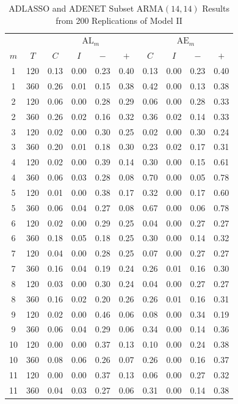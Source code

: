 \begin{table}[ht!]
\footnotesize
\centering
\caption{ADLASSO and ADENET Subset ARMA$(14,14)$ Results from 200 Replications of Model II}
\begin{tabular}{cc|cccc|cccc}
  \hline
    & & \multicolumn{4}{c|}{$\textrm{AL}_m$} & \multicolumn{4}{c}{$\textrm{AE}_m$} \\
  \cline{4-5}  \cline{8-9}  
  $m$ & $T$ & $C$ & $I$ & $-$ & $+$ & $C$ & $I$ & $-$ & $+$ \\
  \hline
  1 & 120 & 0.13 & 0.00 & 0.23 & 0.40 & 0.13 & 0.00 & 0.23 & 0.40 \\ 
  1 & 360 & 0.26 & 0.01 & 0.15 & 0.38 & 0.42 & 0.00 & 0.13 & 0.38 \\ 
  2 & 120 & 0.06 & 0.00 & 0.28 & 0.29 & 0.06 & 0.00 & 0.28 & 0.33 \\ 
  2 & 360 & 0.26 & 0.02 & 0.16 & 0.32 & 0.36 & 0.02 & 0.14 & 0.33 \\ 
  3 & 120 & 0.02 & 0.00 & 0.30 & 0.25 & 0.02 & 0.00 & 0.30 & 0.24 \\ 
  3 & 360 & 0.20 & 0.01 & 0.18 & 0.30 & 0.23 & 0.02 & 0.17 & 0.31 \\ 
  \hline
  4 & 120 & 0.02 & 0.00 & 0.39 & 0.14 & 0.30 & 0.00 & 0.15 & 0.61 \\ 
  4 & 360 & 0.06 & 0.03 & 0.28 & 0.08 & 0.70 & 0.00 & 0.05 & 0.78 \\ 
  5 & 120 & 0.01 & 0.00 & 0.38 & 0.17 & 0.32 & 0.00 & 0.17 & 0.60 \\ 
  5 & 360 & 0.06 & 0.04 & 0.27 & 0.08 & 0.67 & 0.00 & 0.06 & 0.78 \\
  \hline
  6 & 120 & 0.02 & 0.00 & 0.29 & 0.25 & 0.04 & 0.00 & 0.27 & 0.27 \\ 
  6 & 360 & 0.18 & 0.05 & 0.18 & 0.25 & 0.30 & 0.00 & 0.14 & 0.32 \\ 
  7 & 120 & 0.04 & 0.00 & 0.28 & 0.25 & 0.07 & 0.00 & 0.27 & 0.27 \\ 
  7 & 360 & 0.16 & 0.04 & 0.19 & 0.24 & 0.26 & 0.01 & 0.16 & 0.30 \\ 
  8 & 120 & 0.03 & 0.00 & 0.30 & 0.24 & 0.04 & 0.00 & 0.27 & 0.27 \\ 
  8 & 360 & 0.16 & 0.02 & 0.20 & 0.26 & 0.26 & 0.01 & 0.16 & 0.31 \\ 
  \hline
  9 & 120 & 0.02 & 0.00 & 0.46 & 0.06 & 0.08 & 0.00 & 0.34 & 0.19 \\ 
  9 & 360 & 0.06 & 0.04 & 0.29 & 0.06 & 0.34 & 0.00 & 0.14 & 0.36 \\ 
  10 & 120 & 0.00 & 0.00 & 0.37 & 0.13 & 0.10 & 0.00 & 0.24 & 0.38 \\ 
  10 & 360 & 0.08 & 0.06 & 0.26 & 0.07 & 0.26 & 0.00 & 0.16 & 0.37 \\ 
  11 & 120 & 0.00 & 0.00 & 0.37 & 0.13 & 0.06 & 0.00 & 0.27 & 0.32 \\ 
  11 & 360 & 0.04 & 0.03 & 0.27 & 0.06 & 0.31 & 0.00 & 0.14 & 0.38 \\ 
   \hline
\end{tabular}
\label{tab:alaemod2}
\end{table}

